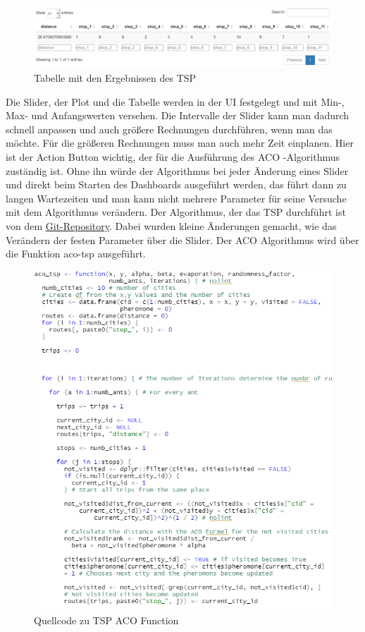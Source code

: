 \begin{figure}[H]
 \centering
 \includegraphics[scale=.7]{"images/05_Tsp/tsp_tabelle.png"}
 \caption{Tabelle mit den Ergebnissen des TSP}
 \label{fig:tsp_tabelle}
\end{figure}
Die Slider, der Plot und die Tabelle werden in der UI festgelegt und mit Min-, Max- und Anfangswerten versehen. Die Intervalle der Slider kann man dadurch schnell anpassen und auch größere Rechnungen durchführen, wenn man das möchte. Für die größeren Rechnungen muss man auch mehr Zeit einplanen. Hier ist der Action Button wichtig, der für die Ausführung des ACO -Algorithmus zuständig ist. Ohne ihn würde der Algorithmus bei jeder Änderung eines Slider und direkt beim Starten des Dashboards ausgeführt werden, das führt dann zu langen Wartezeiten und man kann nicht mehrere Parameter für seine Versuche mit dem Algorithmus verändern. 
\newline
\newline
Der Algorithmus, der das TSP durchführt ist von dem  \href {https://github.com/ciessielski/ACOTSP} {Git-Repository}. Dabei wurden kleine Änderungen gemacht, wie das Verändern der festen Parameter über die Slider. 
\newline
Der ACO Algorithmus wird über die Funktion aco-tsp ausgeführt.
\begin{figure}[h]
 \centering
 \includegraphics[scale=.6]{"images/05_Tsp/fct_aco_tsp1.png"}
 \caption{Quellcode zu TSP ACO Function}
 \label{actionButtonPhasen}
\end{figure}

